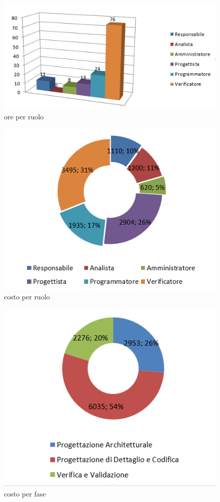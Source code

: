 \documentclass[a4paper,11pt]{article}
\begin{document}
	\begin{figure}[h!]
		\centering
		\includegraphics[scale=0.7]{../Images/ore_per_ruolo_VV.png}
	\caption{ ore per ruolo}
	\end{figure}
	
	\begin{figure}[h!]
		\centering
		\includegraphics[scale=0.7]{../Images/costo_per_ruolo_VV.png}
	\caption{ costo per ruolo}
	\end{figure}
	
\begin{figure}[h!]
		\centering
		\includegraphics[scale=0.7]{../Images/costo_per_fase.png}
	\caption{ costo per fase}
	\end{figure}	
	
\end{document}
